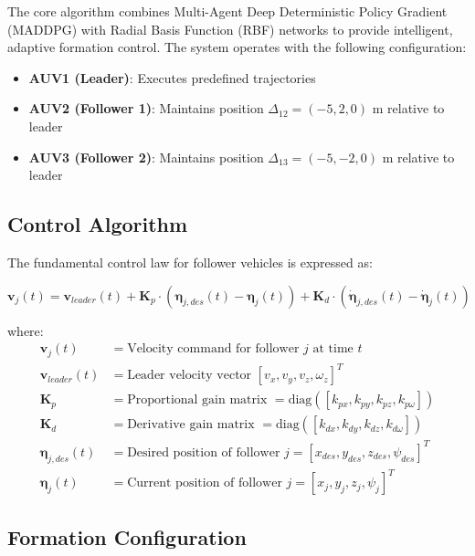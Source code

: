 \documentclass[11pt,a4paper]{article}
\newcommand{\vect}[1]{\boldsymbol{#1}}
\begin{document}
The core algorithm combines Multi-Agent Deep Deterministic Policy Gradient (MADDPG) with Radial Basis Function (RBF) networks to provide intelligent, adaptive formation control. The system operates with the following configuration:

\begin{itemize}
    \item \textbf{AUV1 (Leader)}: Executes predefined trajectories
    \item \textbf{AUV2 (Follower 1)}: Maintains position $\Delta_{12} = (-5, 2, 0)$ m relative to leader
    \item \textbf{AUV3 (Follower 2)}: Maintains position $\Delta_{13} = (-5, -2, 0)$ m relative to leader
\end{itemize}

\subsection{Control Algorithm}

The fundamental control law for follower vehicles is expressed as:

\begin{equation}
\vect{v}_j(t) = \vect{v}_{leader}(t) + \vect{K}_p \cdot (\vect{\eta}_{j,des}(t) - \vect{\eta}_j(t)) + \vect{K}_d \cdot (\dot{\vect{\eta}}_{j,des}(t) - \dot{\vect{\eta}}_j(t))
\label{eq:control_law}
\end{equation}

where:
\begin{align}
\vect{v}_j(t) &= \text{Velocity command for follower } j \text{ at time } t\\
\vect{v}_{leader}(t) &= \text{Leader velocity vector } [v_x, v_y, v_z, \omega_z]^T\\
\vect{K}_p &= \text{Proportional gain matrix } = \text{diag}([k_{px}, k_{py}, k_{pz}, k_{p\omega}])\\
\vect{K}_d &= \text{Derivative gain matrix } = \text{diag}([k_{dx}, k_{dy}, k_{dz}, k_{d\omega}])\\
\vect{\eta}_{j,des}(t) &= \text{Desired position of follower } j = [x_{des}, y_{des}, z_{des}, \psi_{des}]^T\\
\vect{\eta}_j(t) &= \text{Current position of follower } j = [x_j, y_j, z_j, \psi_j]^T
\end{align}

\subsection{Formation Configuration}
\end{document}
